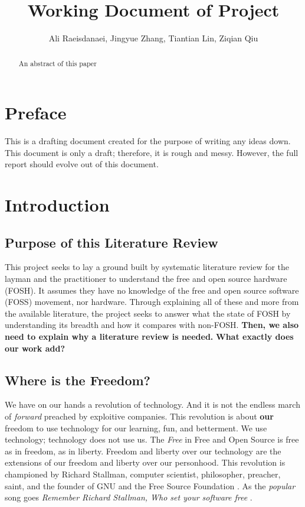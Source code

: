 \documentclass{article}
\begin{document}


\title{Working Document of Project}
\author{Ali Raeisdanaei, Jingyue Zhang, Tiantian Lin, Ziqian Qiu }
\date{}
\maketitle

\section{Preface}
This is a drafting document created for the purpose of writing any ideas down.
This document is only a draft; therefore, it is rough and messy.
However, the full report should evolve out of this document.

\begin{abstract}
    An abstract of this paper
\end{abstract}

\section{Introduction}

\subsection{Purpose of this Literature Review}
This project seeks to lay a ground built by systematic literature review for the layman and the practitioner to understand the free and open source hardware (FOSH).
It assumes they have no knowledge of the free and open source software (FOSS) movement, nor hardware.
Through explaining all of these and more from the available literature, the project seeks to answer what the state of FOSH by understanding its breadth and how it compares with non-FOSH.
\textbf{Then, we also need to explain why a literature review is needed.}
\textbf{What exactly does our work add?}

\subsection{Where is the Freedom?}
We have on our hands a revolution of technology. 
And it is not the endless march of \textit{forward} preached by exploitive companies.
This revolution is about \textbf{our} freedom to use technology for our learning, fun, and betterment.
We use technology; technology does not use us. 
The \textit{Free} in Free and Open Source is free as in freedom, as in liberty.
Freedom and liberty over our technology are the extensions of our freedom and liberty over our personhood.
This revolution is championed by Richard Stallman, computer scientist, philosopher, preacher, saint, and the founder of GNU and the Free Source Foundation \cite{b0_stallman}.
As the \textit{popular} song goes \textit{Remember Richard Stallman,
Who set your software free} \cite{song_GNUs_Not_Unix}.
\end{document}
